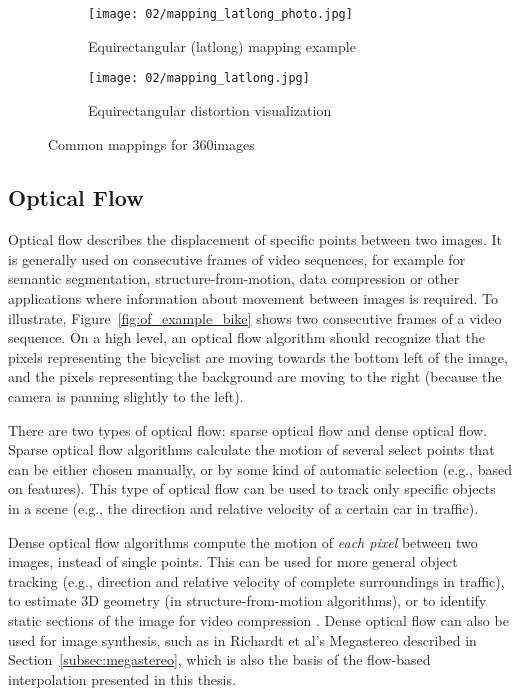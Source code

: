 \begin{figure}
    \hfill
    \begin{subfigure}[t]{0.5\textwidth} 
            \centering
            \texttt{[image: 02/mapping\_latlong\_photo.jpg]}
            \caption{Equirectangular (latlong) mapping example}
    \end{subfigure}%
    \hfill
    \begin{subfigure}[t]{0.5\textwidth}
            \centering
            \texttt{[image: 02/mapping\_latlong.jpg]}
            \caption{Equirectangular distortion visualization}\label{fig:latlong-intro}
    \end{subfigure}
    \hfill
    \caption{Common mappings for 360\degree images}\label{fig:common_mappings}
  \end{figure}
  
\subsection{Optical Flow} \label{subsec:optical_flow}
Optical flow describes the displacement of specific points between two images. It is generally used on consecutive frames of video sequences, for example for semantic segmentation, structure-from-motion, data compression or other applications where information about movement between images is required. To illustrate, Figure~\ref{fig:of_example_bike} shows two consecutive frames of a video sequence. On a high level, an optical flow algorithm should recognize that the pixels representing the bicyclist are moving towards the bottom left of the image, and the pixels representing the background are moving to the right (because the camera is panning slightly to the left).

There are two types of optical flow: sparse optical flow and dense optical flow. Sparse optical flow algorithms calculate the motion of several select points that can be either chosen manually, or by some kind of automatic selection (e.g., based on features). This type of optical flow can be used to track only specific objects in a scene (e.g., the direction and relative velocity of a certain car in traffic).

Dense optical flow algorithms compute the motion of \emph{each pixel} between two images, instead of single points. This can be used for more general object tracking (e.g., direction and relative velocity of complete surroundings in traffic), to estimate 3D geometry (in structure-from-motion algorithms), or to identify static sections of the image for video compression \cite{of-survey}. Dense optical flow can also be used for image synthesis, such as in Richardt et al's Megastereo \cite{megastereo} described in Section~\ref{subsec:megastereo}, which is also the basis of the flow-based interpolation presented in this thesis.

